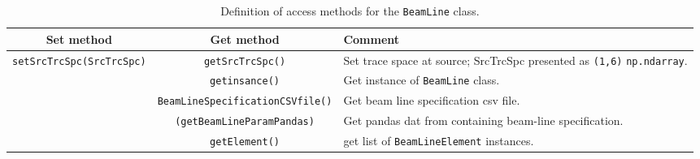 \begin{sidewaystable}[h]
  \caption{
    Definition of access methods for the \texttt{BeamLine}
    class. 
  }
  \label{Tab:BL:AccessMethods}
  \begin{center}
    \begin{tabular}{|c|c|p{10cm}|}
      \hline
      \textbf{Set method} & \textbf{Get method}  & \textbf{Comment}                                                              \\
      \hline
      \texttt{setSrcTrcSpc(SrcTrcSpc)} & \texttt{getSrcTrcSpc()} & Set trace space at source; SrcTrcSpc presented as \texttt{(1,6)}
                                                                   \texttt{np.ndarray}.                                          \\
                                         & \texttt{getinsance()} & Get instance of \texttt{BeamLine} class.                        \\
                       & \texttt{BeamLineSpecificationCSVfile()} & Get beam line specification csv file.                           \\
                             & \texttt{(getBeamLineParamPandas)} & Get pandas dat from containing beam-line specification.         \\
                                         & \texttt{getElement()} & get list of \texttt{BeamLineElement} instances.                 \\
      \hline
    \end{tabular}
  \end{center}
\end{sidewaystable}

